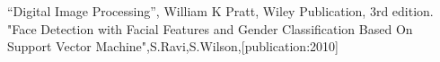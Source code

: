 \documentclass[journal]{IEEEtran}
\begin{document}
	
	\begin{thebibliography}{1}
	“Digital Image Processing”, William K Pratt, Wiley
	Publication, 3rd edition.
	"Face Detection with Facial Features and Gender Classification Based On
	Support Vector Machine",S.Ravi,S.Wilson,[publication:2010]
	
	\end{thebibliography}
	
	
	
\end{document}
